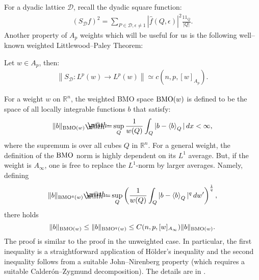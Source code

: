 \documentclass[12pt]{amsart}
\begin{document}
For a dyadic lattice ${\mathcal{{D}}}$, recall the dyadic square function:
\begin{align*}
(S_{{\mathcal{{D}}}}f)^2
=\sum_{P\in{\mathcal{{D}}},{\epsilon}\neq 1}{\ensuremath{\left\vert{\widehat{f}(Q,{\epsilon})}\right\vert}}^2 \frac{{1\!\!1}_Q}{|Q|}.
\end{align*}
Another property of $A_p$ weights which will be useful for us is the following well--known weighted 
Littlewood--Paley Theorem:

\begin{thm}\label{T:squareFunctBounds}
Let $w\in A_p$, then:
\begin{align*}
 {\ensuremath{\left\|{S_{{\mathcal{{D}}}}:L^p(w)\to L^p(w)}\right\|}}\simeq c(n, p, [w]_{A_p}).
\end{align*}
\end{thm}

For a weight $w$ on ${\mathbb{R}}^n$, the weighted BMO space ${\textnormal{BMO}}(w)$ is defined to be the space of all locally 
integrable functions $b$ that satisfy:
	\begin{equation} \label{E:wBMONorm1}
	\|b\|_{{\textnormal{BMO}}(w)} {\mathrel{\rlap{                     \raisebox{0.3ex}{$\m@th\cdot$}}                     \raisebox{-0.3ex}{$\m@th\cdot$}}                     =} \sup_{Q} \frac{1}{w(Q)} \int_Q |b - \left<b\right>_Q|\,dx  < \infty,
	\end{equation}
where the supremum is over all cubes $Q$ in ${\mathbb{R}}^n$. 
For a general weight, the definition of the ${\textnormal{BMO}}$ norm is highly dependent on its $ L ^{1}$ average.  
But, if the weight is $ A_ \infty $, one is free to replace the $ L ^{1}$-norm by larger averages.  
Namely, defining 
	\begin{equation} \label{E:wBMONormq}
	\|b\|_{{\textnormal{BMO}}^q(w)} {\mathrel{\rlap{                     \raisebox{0.3ex}{$\m@th\cdot$}}                     \raisebox{-0.3ex}{$\m@th\cdot$}}                     =} \sup_{Q} \left( \frac{1}{w(Q)} 
	\int_Q |b - \left<b\right>_Q|^q\,dw' \right)^{\frac{1}{q}},
	\end{equation}
there holds
	\begin{equation} \label{E:wBMO-qEquiv}
	\|b\|_{{\textnormal{BMO}}(w)} \leq \|b\|_{{\textnormal{BMO}}^q(w)} \leq C(n, p, [w]_{A_ {\infty}} ) \|b\|_{{\textnormal{BMO}}(w)}.
	\end{equation}
The proof is similar to the proof in the unweighted case. In particular,  
the first inequality is a straightforward application of H\"older's inequality and
the second inequality follows from a suitable John--Nirenberg property 
(which requires a suitable Calder\'{o}n--Zygmund decomposition). The details are 
in \cite{MucWhe1975}.
	
\end{document}
